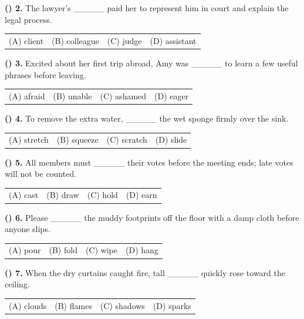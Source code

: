 \documentclass[11pt,a4paper]{article}
\newenvironment{qblock}{\par\vspace{3pt}\noindent\begin{minipage}{\linewidth}}{\end{minipage}\par\vspace{4pt}}
\begin{document}
\begin{qblock}
\textbf{(\hspace{0.6cm}) 2.} The lawyer's \_\_\_\_\_ paid her to represent him in court and explain the legal process.
\par
\begin{tabularx}{\linewidth}{@{}XXXX@{}}
(A) client & (B) colleague & (C) judge & (D) assistant
\end{tabularx}
\end{qblock}
\begin{qblock}
\textbf{(\hspace{0.6cm}) 3.} Excited about her first trip abroad, Amy was \_\_\_\_\_ to learn a few useful phrases before leaving.
\par
\begin{tabularx}{\linewidth}{@{}XXXX@{}}
(A) afraid & (B) unable & (C) ashamed & (D) eager
\end{tabularx}
\end{qblock}
\begin{qblock}
\textbf{(\hspace{0.6cm}) 4.} To remove the extra water, \_\_\_\_\_ the wet sponge firmly over the sink.
\par
\begin{tabularx}{\linewidth}{@{}XXXX@{}}
(A) stretch & (B) squeeze & (C) scratch & (D) slide
\end{tabularx}
\end{qblock}
\begin{qblock}
\textbf{(\hspace{0.6cm}) 5.} All members must \_\_\_\_\_ their votes before the meeting ends; late votes will not be counted.
\par
\begin{tabularx}{\linewidth}{@{}XXXX@{}}
(A) cast & (B) draw & (C) hold & (D) earn
\end{tabularx}
\end{qblock}
\begin{qblock}
\textbf{(\hspace{0.6cm}) 6.} Please \_\_\_\_\_ the muddy footprints off the floor with a damp cloth before anyone slips.
\par
\begin{tabularx}{\linewidth}{@{}XXXX@{}}
(A) pour & (B) fold & (C) wipe & (D) hang
\end{tabularx}
\end{qblock}
\begin{qblock}
\textbf{(\hspace{0.6cm}) 7.} When the dry curtains caught fire, tall \_\_\_\_\_ quickly rose toward the ceiling.
\par
\begin{tabularx}{\linewidth}{@{}XXXX@{}}
(A) clouds & (B) flames & (C) shadows & (D) sparks
\end{tabularx}
\end{qblock}
\end{document}
